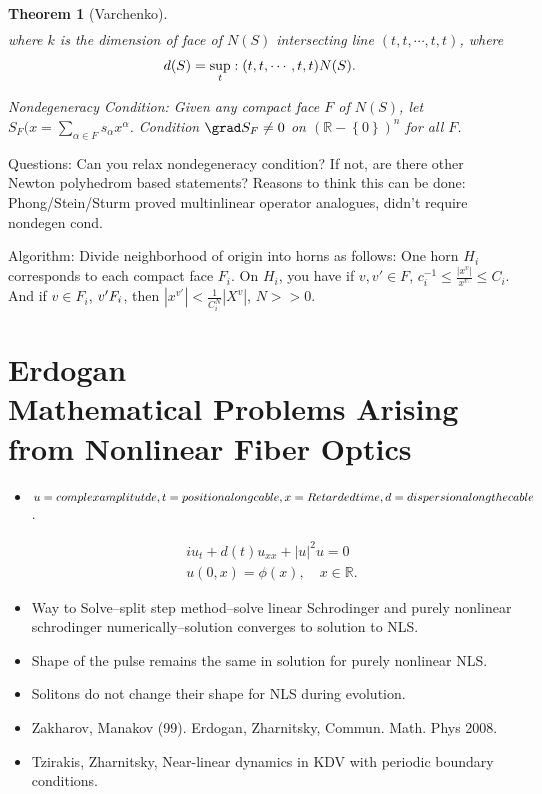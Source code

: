 \documentclass[12pt,reqno]{amsart}
\numberwithin{equation}{section}  %
\newcommand{\nin}{\noindent}
\newcommand{\rr}{\mathbb{R}}
\newtheorem{theorem}{Theorem}[section]
\begin{document}
\begin{itemize}
\begin{theorem}[Varchenko]
\begin{gather*}
    \end{gather*}
    where $k$ is the dimension of face of $N(S)$ intersecting line $(t, t, \cdots, t, t)$, where
    \begin{gather*}
      d(S) = \sup_{t}: (t, t, \cdots, t, t) \nin N(S).
    \end{gather*}
    \item{}
      Nondegeneracy Condition: Given any compact face $F$ of $N(S)$, let $S_{F}(	x = \sum_{\alpha \in F} s_{\alpha} x^{\alpha}$. Condition $\grad S_{F} \neq 0$ on $(\rr - \left\{ 0 \right\})^{n}$ for all $F$. 
\end{theorem}
\item{}
  Questions: Can you relax nondegeneracy condition? If not, are there other Newton polyhedrom based statements? Reasons to think this can be done: Phong/Stein/Sturm proved multinlinear operator analogues, didn't require nondegen cond.
  \item{}
    Algorithm: Divide neighborhood of origin into horns as follows: One horn $H_{i}$ corresponds to each compact face $F_{i}$. On $H_{i}$, you have if $v, v' \in F$, $c_{i}^{-1} \le \frac{| x^{v} |}{x^{v_{'}}} \le C_{i}$. And if $v \in F_{i}$, $v' \nin F_{i}$, then $| x^{v'} | < \frac{1}{C_{i}^{N}}| X^{v} |$, $N >>0$. 
\end{itemize}
\section{Erdogan \\ Mathematical Problems Arising from Nonlinear Fiber Optics}

\begin{itemize}
  \item 
$u = complex amplitutde, \\
t = position along cable, x = Retarded time, d = dispersion along the cable$. 

    \begin{gather*}
    iu_{t} + d(t) u_{xx} + | u |^{2} u = 0
    \\
    u(0,x) = \phi(x), \quad x \in \rr.
    \end{gather*}
\end{itemize}
\begin{itemize}
  \item Way to Solve--split step method--solve linear Schrodinger and purely nonlinear schrodinger numerically--solution converges to solution to NLS.
    \item{}
    Shape of the pulse remains the same in solution for purely nonlinear NLS.
    \item{}
    Solitons do not change their shape for NLS during evolution.
    \item{}
    Zakharov, Manakov (99). Erdogan, Zharnitsky, Commun. Math. Phys 2008.
    \item{}
    Tzirakis, Zharnitsky, Near-linear dynamics in KDV with periodic boundary conditions.
\end{itemize}
  
\end{document}
